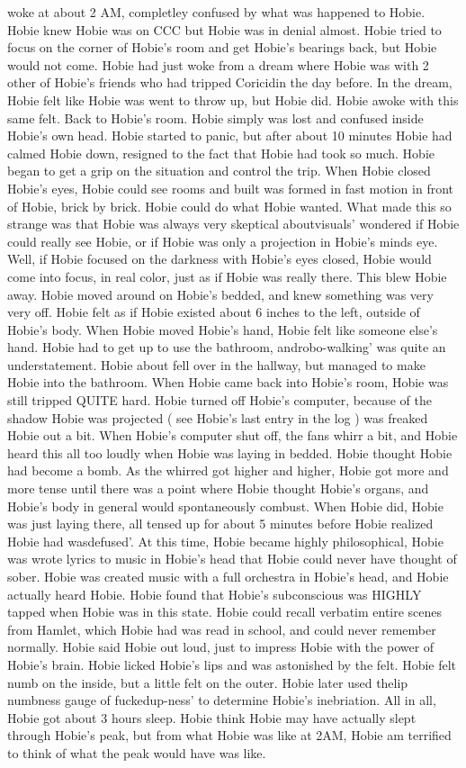 \documentclass[12pt]{book}
\begin{document}
woke at about 2 AM, completley confused by what was happened to Hobie. Hobie knew Hobie was on CCC but Hobie was in denial almost. Hobie tried to focus on the corner of Hobie's room and get Hobie's bearings back, but Hobie would not come. Hobie had just woke from a dream where Hobie was with 2 other of Hobie's friends who had tripped Coricidin the day before. In the dream, Hobie felt like Hobie was went to throw up, but Hobie did. Hobie awoke with this same felt. Back to Hobie's room. Hobie simply was lost and confused inside Hobie's own head. Hobie started to panic, but after about 10 minutes Hobie had calmed Hobie down, resigned to the fact that Hobie had took so much. Hobie began to get a grip on the situation and control the trip. When Hobie closed Hobie's eyes, Hobie could see rooms and built was formed in fast motion in front of Hobie, brick by brick. Hobie could do what Hobie wanted. What made this so strange was that Hobie was always very skeptical aboutvisuals' wondered if Hobie could really see Hobie, or if Hobie was only a projection in Hobie's minds eye. Well, if Hobie focused on the darkness with Hobie's eyes closed, Hobie would come into focus, in real color, just as if Hobie was really there. This blew Hobie away. Hobie moved around on Hobie's bedded, and knew something was very very off. Hobie felt as if Hobie existed about 6 inches to the left, outside of Hobie's body. When Hobie moved Hobie's hand, Hobie felt like someone else's hand. Hobie had to get up to use the bathroom, androbo-walking' was quite an understatement. Hobie about fell over in the hallway, but managed to make Hobie into the bathroom. When Hobie came back into Hobie's room, Hobie was still tripped QUITE hard. Hobie turned off Hobie's computer, because of the shadow Hobie was projected ( see Hobie's last entry in the log ) was freaked Hobie out a bit. When Hobie's computer shut off, the fans whirr a bit, and Hobie heard this all too loudly when Hobie was laying in bedded. Hobie thought Hobie had become a bomb. As the whirred got higher and higher, Hobie got more and more tense until there was a point where Hobie thought Hobie's organs, and Hobie's body in general would spontaneously combust. When Hobie did, Hobie was just laying there, all tensed up for about 5 minutes before Hobie realized Hobie had wasdefused'. At this time, Hobie became highly philosophical, Hobie was wrote lyrics to music in Hobie's head that Hobie could never have thought of sober. Hobie was created music with a full orchestra in Hobie's head, and Hobie actually heard Hobie. Hobie found that Hobie's subconscious was HIGHLY tapped when Hobie was in this state. Hobie could recall verbatim entire scenes from Hamlet, which Hobie had was read in school, and could never remember normally. Hobie said Hobie out loud, just to impress Hobie with the power of Hobie's brain. Hobie licked Hobie's lips and was astonished by the felt. Hobie felt numb on the inside, but a little felt on the outer. Hobie later used thelip numbness gauge of fuckedup-ness' to determine Hobie's inebriation. All in all, Hobie got about 3 hours sleep. Hobie think Hobie may have actually slept through Hobie's peak, but from what Hobie was like at 2AM, Hobie am terrified to think of what the peak would have was like.
\end{document}
